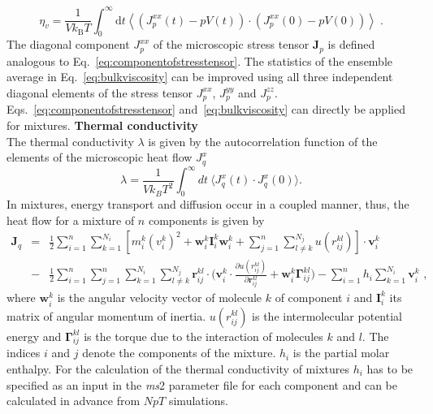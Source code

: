 \begin{equation}
\eta_{v}=\frac{1}{Vk_{\text{B}}T} \int^{\infty}_{0} \mathrm dt \left\langle \left(J^{xx}_{p}\left(t\right)-pV\left(t\right)\right) \cdot \left(J^{xx}_{p}\left(0\right)-pV\left(0\right)\right)\right\rangle \;.
\label{eq:bulkviscosity}
\end{equation}
The diagonal component $J^{xx}_{p}$ of the microscopic stress tensor $\textbf{J}_{p}$ is defined analogous to Eq.~\eqref{eq:componentofstresstensor}. The statistics of the ensemble average in Eq.~\eqref{eq:bulkviscosity} can be improved using all three independent diagonal elements of the stress tensor $J^{xx}_{p}$, $J^{yy}_{p}$ and $J^{zz}_{p}$. Eqs.~\eqref{eq:componentofstresstensor} and~\eqref{eq:bulkviscosity} can directly be applied for mixtures.
\newline \newline
\textbf{Thermal conductivity}\\
The thermal conductivity $\lambda$ is given by the autocorrelation function of the elements of the microscopic heat flow ${J}^{x}_{q}$
\begin{equation}\label{themalcond}
\lambda=\frac{1}{Vk_BT^{2}}\int_{0}^{\infty} dt~\big\langle {J}^x_q(t)\cdot {J}^x_q(0)\big\rangle.
\end{equation}
\noindent In mixtures, energy transport and diffusion occur in a coupled manner, thus, the heat flow for a mixture of $n$ components is given by~\parencite{Evans1978}
\begin{eqnarray}
\mathbf{J}_q &=& \frac{1}{2} \sum_{i=1}^{n} \sum_{k=1}^{N_i}\left[ m_{i}^{k}\left({v}_{i}^{k}\right)^2+ \nonumber
\mathbf{w}_i^k \mathbf{I}_i^k \mathbf{w}_i^k+\sum_{j=1}^{n}\sum_{l \neq k}^{N_j} u\left(r_{ij}^{kl}\right)\right]\cdot \mathbf{v}_i^k \\
& -&\frac{1}{2}\sum_{i=1}^{n} \sum_{j=1}^{n} \sum_{k=1}^{N_i} \sum_{l \neq k}^{N_j} \bm{r}_{ij}^{kl}\cdot
\big( \mathbf{v}_i^k \cdot \frac{\partial u\left(r_{ij}^{kl}\right)}{\partial \bm{r}_{ij}^{kl}}+\mathbf{w}_i^k \mathbf{\Gamma}_{ij}^{kl}\big)- \sum_{i=1}^{n} h_{i}\sum_{k=1}^{N_i} \mathbf{v}_{i}^{k}\mbox{   ,}\label{heatflow} 
\end{eqnarray}
\noindent where $\mathbf{w}^k_i$ is the angular velocity vector of molecule $k$ of component $i$ and $\mathbf{I}^k_i$ its matrix of angular momentum of inertia. $u\left(r_{ij}^{kl}\right)$ is the intermolecular potential energy and $\mathbf{\Gamma}_{ij}^{kl}$ is the torque due to the interaction of molecules $k$ and $l$. The indices $i$ and $j$ denote the components of the mixture. $h_{i}$ is the partial molar enthalpy. For the calculation of the thermal conductivity of mixtures $h_i$ has to be specified as an input in the \textit{ms}2 parameter file for each component and can be calculated in advance from $NpT$ simulations.
